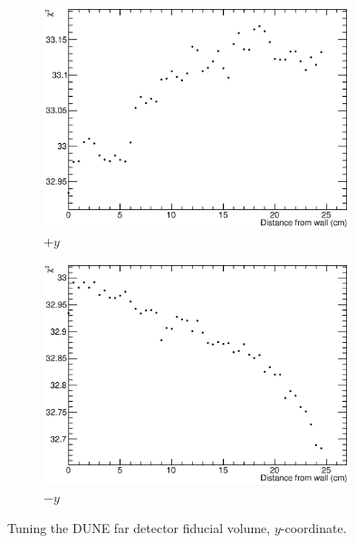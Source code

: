 \begin{figure}
  \centering
  \begin{subfigure}[t]{0.48\linewidth}
    \centering
    \includegraphics[width=0.98\textwidth]{FVTunePosY.eps}
    \caption{$+y$}
    \label{fig:FVTunePosY}
  \end{subfigure}
  \hfill
  \begin{subfigure}[t]{0.48\linewidth}
    \centering
    \includegraphics[width=0.98\textwidth]{FVTuneNegY.eps}
    \caption{$-y$}
    \label{fig:FVTuneNegY}
  \end{subfigure}
  \caption[Tuning the DUNE far detector fiducial volume, $y$-coordinate.]{Tuning the DUNE far detector fiducial volume, $y$-coordinate.}
  \label{fig:FVTuneY}
\end{figure}

